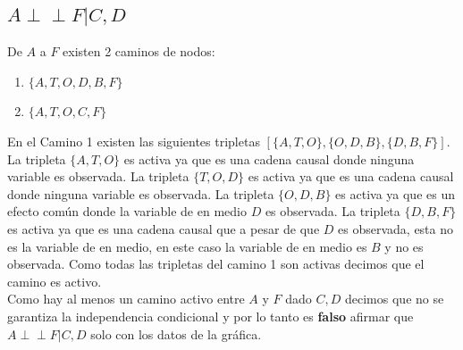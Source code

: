 \documentclass[12pt]{article}
\begin{document}
\subsection{$A  \perp\!\!\!\perp F | C,D$}
De $A$ a $F$ existen 2 caminos de nodos:
\begin{enumerate}
	\item $\{A, T, O, D, B, F\}$
	\item $\{A, T, O, C, F\}$
\end{enumerate}
En el Camino 1 existen las siguientes tripletas $[\{A,T,O\},\{O,D,B\},\{D,B,F\}]$. La tripleta $\{A,T,O\}$ es activa ya que es una cadena causal donde ninguna variable es observada. La tripleta $\{T,O,D\}$ es activa ya que es una cadena causal donde ninguna variable es observada. La tripleta $\{O,D,B\}$ es activa ya que es un efecto común donde la variable de en medio $D$ es observada. La tripleta $\{D,B,F\}$ es activa ya que es una cadena causal que a pesar de que $D$ es observada, esta no es la variable de en medio, en este caso la variable de en medio es $B$ y no es observada. Como todas las tripletas del camino 1 son activas decimos que el camino es activo.\\
Como hay al menos un camino activo entre $A$ y $F$ dado $C,D$ decimos que no se garantiza la independencia condicional y por lo tanto es \textbf{falso} afirmar que $A  \perp\!\!\!\perp F | C,D$ solo con los datos de la gráfica.
\end{document}
